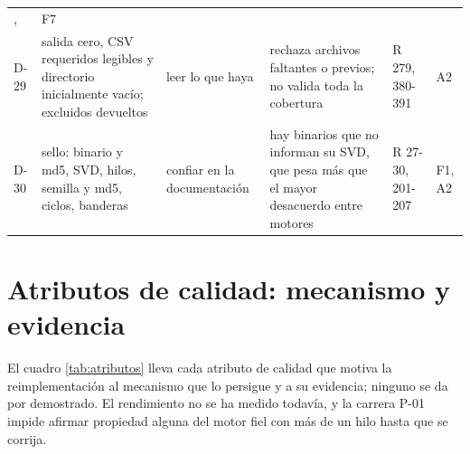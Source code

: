 {\begin{longtable}{L{0.85cm}L{3.1cm}L{2.2cm}L{3.2cm}L{2.25cm}L{0.95cm}}
,  & F7 \\
D-29 & salida cero, CSV requeridos legibles y directorio inicialmente vacío; excluidos devueltos
& leer lo que haya & rechaza archivos faltantes o previos; no valida toda la cobertura & R 279, 380-391
& A2 \\
D-30 & sello: binario y md5, SVD, hilos, semilla y md5, ciclos, banderas & confiar en la
documentación & hay binarios que no informan su SVD, que pesa más que el mayor desacuerdo entre
motores & R 27-30, 201-207 & F1, A2 \\
\end{longtable}
}

\section{Atributos de calidad: mecanismo y evidencia}
\label{sec:atributos}

El cuadro \ref{tab:atributos} lleva cada atributo de calidad que motiva la reimplementación al
mecanismo que lo persigue y a su evidencia; ninguno se da por demostrado. El rendimiento no se
ha medido todavía, y la carrera P-01 impide afirmar propiedad alguna del motor fiel con más
de un hilo hasta que se corrija.

